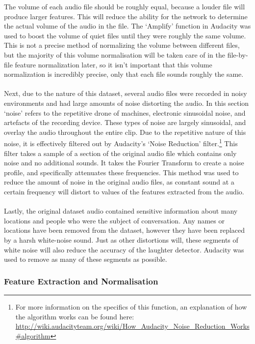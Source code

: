 \documentclass[a4paper,11pt,notitlepage]{article}
\begin{document}
The volume of each audio file should be roughly equal, because a louder file will produce larger features. This will reduce the ability for the network to determine the actual volume of the audio in the file. The `Amplify' function in Audacity was used to boost the volume of quiet files until they were roughly the same volume. This is not a precise method of normalizing the volume between different files, but the majority of this volume normalisation will be taken care of in the file-by-file feature normalization later, so it isn't important that this volume normalization is incredibly precise, only that each file sounds roughly the same.\\
\\
Next, due to the nature of this dataset, several audio files were recorded in noisy environments and had large amounts of noise distorting the audio. In this section `noise' refers to the repetitive drone of machines, electronic sinusoidal noise, and artefacts of the recording device. These types of noise are largely sinusoidal, and overlay the audio throughout the entire clip. Due to the repetitive nature of this noise, it is effectively filtered out by Audacity's `Noise Reduction' filter.\footnote{For more information on the specifics of this function, an explanation of how the algorithm works can be found here: \url{http://wiki.audacityteam.org/wiki/How_Audacity_Noise_Reduction_Works#algorithm}} This filter takes a sample of a section of the original audio file which contains only noise and no additional sounds. It takes the Fourier Transform to create a noise profile, and specifically attenuates these frequencies. This method was used to reduce the amount of noise in the original audio files, as constant sound at a certain frequency will distort to values of the features extracted from the audio.\\
\\
Lastly, the original dataset audio contained sensitive information about many locations and people who were the subject of conversation. Any names or locations have been removed from the dataset, however they have been replaced by a harsh white-noise sound. Just as other distortions will, these segments of white noise will also reduce the accuracy of the laughter detector.  Audacity was used to remove as many of these segments as possible.

\subsubsection{Feature Extraction and Normalisation}
\end{document}
